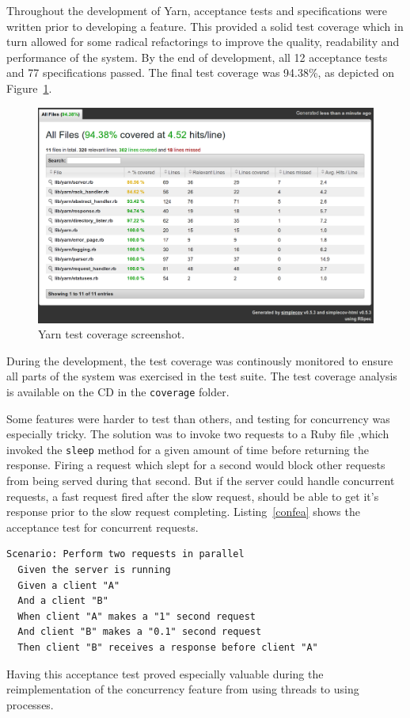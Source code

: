 Throughout the development of Yarn, acceptance tests and specifications were
written prior to developing a feature. This provided a solid test coverage
which in turn allowed for some radical refactorings to improve the quality,
readability and performance of the system. By the end of development, all
12 acceptance tests and 77 specifications passed. The final test coverage was
94.38\%, as depicted on Figure~\ref{coverage}. 

\begin{figure}[htb]
  \centering
  \includegraphics[width=1.0\textwidth]{img/coverage.png}
  \caption{Yarn test coverage screenshot.}
  \label{coverage}
\end{figure}

During the development, the test coverage was continously monitored to ensure
all parts of the system was exercised in the test suite. The test coverage
analysis is available on the CD in the \texttt{coverage} folder.

Some features were harder to test than others, and testing for concurrency was
especially tricky. The solution was to invoke two requests to a Ruby file
,which invoked the \texttt{sleep} method for a given amount of time before
returning the response. Firing a request which slept for a second would block
other requests from being served during that second. But if the server could
handle concurrent requests, a fast request fired after the slow request,
should be able to get it's response prior to the slow request completing.
Listing~\ref{confea} shows the acceptance test for concurrent requests.

\bigskip
\begin{lstlisting}[label=confea,caption=Concurrency acceptance test
(features/concurrency.feature:7)]
Scenario: Perform two requests in parallel
  Given the server is running
  Given a client "A"
  And a client "B"
  When client "A" makes a "1" second request
  And client "B" makes a "0.1" second request
  Then client "B" receives a response before client "A"
\end{lstlisting}

Having this acceptance test proved especially valuable during the
reimplementation of the concurrency feature from using threads to using
processes.
